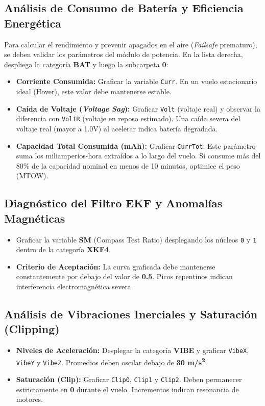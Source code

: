\documentclass[12pt,a4paper]{article}
\begin{document}
\subsection{Análisis de Consumo de Batería y Eficiencia Energética}
Para calcular el rendimiento y prevenir apagados en el aire (\textit{Failsafe} prematuro), se deben validar los parámetros del módulo de potencia. En la lista derecha, despliega la categoría \textbf{BAT} y luego la subcarpeta \textbf{0}:
\begin{itemize}[leftmargin=*]
    \item \textbf{Corriente Consumida:} Graficar la variable \texttt{Curr}. En un vuelo estacionario ideal (Hover), este valor debe mantenerse estable. 
    \item \textbf{Caída de Voltaje (\textit{Voltage Sag}):} Graficar \texttt{Volt} (voltaje real) y observar la diferencia con \texttt{VoltR} (voltaje en reposo estimado). Una caída severa del voltaje real (mayor a 1.0V) al acelerar indica batería degradada.
    \item \textbf{Capacidad Total Consumida (mAh):} Graficar \texttt{CurrTot}. Este parámetro suma los miliamperios-hora extraídos a lo largo del vuelo. Si consume más del 80\% de la capacidad nominal en menos de 10 minutos, optimice el peso (MTOW).
\end{itemize}

\subsection{Diagnóstico del Filtro EKF y Anomalías Magnéticas}
\begin{itemize}[leftmargin=*]
    \item Graficar la variable \textbf{SM} (Compass Test Ratio) desplegando los núcleos \texttt{0} y \texttt{1} dentro de la categoría \textbf{XKF4}.
    \item \textbf{Criterio de Aceptación:} La curva graficada debe mantenerse constantemente por debajo del valor de \textbf{0.5}. Picos repentinos indican interferencia electromagnética severa.
\end{itemize}

\subsection{Análisis de Vibraciones Inerciales y Saturación (Clipping)}
\begin{itemize}[leftmargin=*]
    \item \textbf{Niveles de Aceleración:} Desplegar la categoría \textbf{VIBE} y graficar \texttt{VibeX}, \texttt{VibeY} y \texttt{VibeZ}. Promedios deben oscilar debajo de \textbf{30 m/s\textsuperscript{2}}.
    \item \textbf{Saturación (Clip):} Graficar \texttt{Clip0}, \texttt{Clip1} y \texttt{Clip2}. Deben permanecer estrictamente en \textbf{0} durante el vuelo. Incrementos indican resonancia de motores.
\end{itemize}
\end{document}
